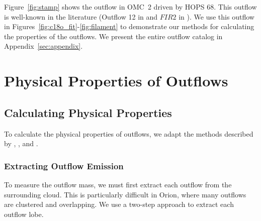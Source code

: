 \documentclass[twocolumn]{aastex63}
\newcommand{\example}{HOPS 68}
\newcommand{\kms}{km~s$^{-1}$}
\newcommand{\co}[1][]{\ensuremath{^{#1}}CO}
\begin{document}
Figure~\ref{fig:stamp} shows the outflow in OMC~2 driven by \example{}. This outflow is well-known in the literature (Outflow 12 in \citealp{Tanabe:submitted} and $FIR 2$ in \citealp{Takahashi08}). We use this outflow in Figures~\ref{fig:c18o_fit}-\ref{fig:filament} to demonstrate our methods for calculating the properties of the outflows. We present the entire outflow catalog in Appendix~\ref{sec:appendix}.


\begin{figure*}[]
\centering
{}
\caption{Outflow around \example{}. The blue (red) \textit{contours} show \co[12]{} integrated from -2 \kms{} to $v_{\rm blue}$ ($v_{\rm red}$ to 20 \kms{}), where $v_{\rm blue}$ and $v_{\rm red}$ are given in Table~\ref{tab:outflows}. Contour levels go from 5 to 50$\sigma$, in steps of 5$\sigma$ where $\sigma$ is the RMS error in the integrated map. The \textit{thick contours} show the region we extract for each lobe. The \textit{shaded wedges} show the best-fit position angle and opening angle for the outflow lobes. The \textit{black dotted line} shows the closest C$^{18}$O filament from \citet{Suri19}. \textit{Black squares} indicate HOPS protostars from \citet{Furlan16}, \textit{black crosses} indicate H$_2$ outflow sources from \citet{Davis09}, and small \textit{black points} indicate all \emph{Spitzer} YSOs from \citet{Megeath12}.\label{fig:stamp}}
\end{figure*}

\section{Physical Properties of Outflows}\label{sec:physics}
\subsection{Calculating Physical Properties}
To calculate the physical properties of outflows, we adapt the methods described by \citet{Arce01}, \citet{Dunham14}, and \citet{ZhangY16}.
\subsubsection{Extracting Outflow Emission}\label{sec:extraction}
To measure the outflow mass, we must first extract each outflow from the surrounding cloud. This is particularly difficult in Orion, where many outflows are clustered and overlapping. We use a two-step approach to extract each outflow lobe.
\end{document}
